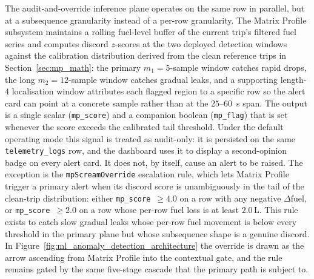 The audit-and-override inference plane operates on the same row in parallel, but at a subsequence granularity instead of a per-row granularity. The Matrix Profile subsystem maintains a rolling fuel-level buffer of the current trip's filtered fuel series and computes discord $z$-scores at the two deployed detection windows against the calibration distribution derived from the clean reference trips in Section~\ref{sec:mp_math}: the primary $m_1 = 5$-sample window catches rapid drops, the long $m_2 = 12$-sample window catches gradual leaks, and a supporting length-$4$ localisation window attributes each flagged region to a specific row so the alert card can point at a concrete sample rather than at the $25$--$60$~s span. The output is a single scalar (\texttt{mp\_score}) and a companion boolean (\texttt{mp\_flag}) that is set whenever the score exceeds the calibrated tail threshold. Under the default operating mode this signal is treated as audit-only: it is persisted on the same \texttt{telemetry\_logs} row, and the dashboard uses it to display a second-opinion badge on every alert card. It does not, by itself, cause an alert to be raised. The exception is the \texttt{mpScreamOverride} escalation rule, which lets Matrix Profile trigger a primary alert when its discord score is unambiguously in the tail of the clean-trip distribution: either \texttt{mp\_score}~$\geq 4.0$ on a row with any negative $\Delta\text{fuel}$, or \texttt{mp\_score}~$\geq 2.0$ on a row whose per-row fuel loss is at least $2.0$\,L. This rule exists to catch slow gradual leaks whose per-row fuel movement is below every threshold in the primary plane but whose subsequence shape is a genuine discord. In Figure~\ref{fig:ml_anomaly_detection_architecture} the override is drawn as the arrow ascending from Matrix Profile into the contextual gate, and the rule remains gated by the same five-stage cascade that the primary path is subject to.

